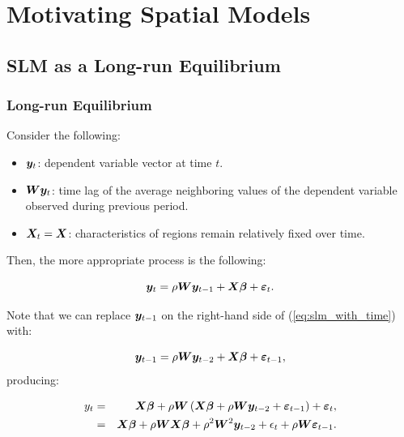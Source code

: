 \documentclass[english,10pt]{beamer}\usepackage[]{graphicx}\usepackage[]{xcolor}
\begin{document}
\section{Motivating Spatial Models}

\subsection{SLM as a Long-run Equilibrium}

\begin{frame}
  \frametitle{Long-run Equilibrium}
  Consider the following:
    \begin{itemize}
      \item $\bm y_t$: dependent variable vector at time $t$.
      \item $\bm W\bm y_t$: time lag of the average neighboring values of the dependent variable observed during previous period. 
      \item $\bm X_t= \bm X$: characteristics of regions remain relatively fixed over time.
    \end{itemize}
    
    Then, the more appropriate process is the following:

\begin{equation}\label{eq:slm_with_time}
\bm y_t = \rho \bm W\bm y_{t-1} + \bm X\bm \beta + \bm {\varepsilon}_t.
\end{equation}

Note that we can replace $\bm y_{t-1}$ on the right-hand side of (\ref{eq:slm_with_time}) with:

\begin{equation*}
\bm y_{t-1} = \rho \bm W\bm y_{t-2} + \bm X\bm \beta + \bm {\varepsilon}_{t-1},
\end{equation*}
%
producing:

\begin{eqnarray}
y_t & = & \bm X\bm \beta +\rho\bm W\left(\bm X\bm \beta + \rho \bm W\bm y_{t-2} + \bm {\varepsilon}_{t-1}\right) + \bm {\varepsilon}_t, \label{eq:recur_1}\\
&=& \bm X\bm \beta +\rho\bm W\bm X\bm \beta + \rho^2\bm W^2\bm y_{t-2} + \epsilon_t + \rho\bm W\bm {\varepsilon}_{t-1}.\label{eq:recur_2}
\end{eqnarray}
\end{frame}
\end{document}
